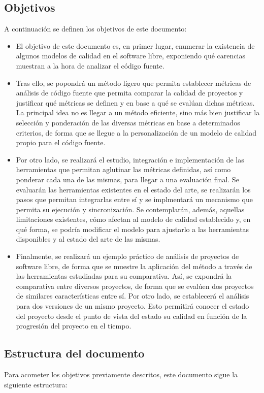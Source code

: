 \documentclass[11pt]{article}
\begin{document}
\subsection{Objetivos}
A continuación se definen los objetivos de este documento:
\begin{itemize}
\item{El objetivo de este documento es, en primer lugar, enumerar la existencia de algunos modelos de calidad en el software libre, exponiendo qué carencias muestran a la hora de analizar el código fuente.}
\item{Tras ello, se popondrá un método ligero que permita establecer métricas de análisis de código fuente que permita comparar la calidad de proyectos y justificar qué métricas se definen y en base a qué se evalúan dichas métricas. La principal idea no es llegar a un método eficiente, sino más bien justificar la selección y ponderación de las diversas métricas en base a determinados criterios, de forma que se llegue a la personalización de un modelo de calidad propio para el código fuente}.
\item{Por otro lado, se realizará el estudio, integración e implementación de las herramientas que permitan aglutinar las métricas definidas, así como ponderar cada una de las mismas, para llegar a una evaluación final. Se evaluarán las herramientas existentes en el estado del arte, se realizarán los pasos que permitan integrarlas entre sí y se implmentará un mecanismo que permita su ejecución y sincronización. Se contemplarán, además, aquellas limitaciones existentes, cómo afectan al modelo de calidad establecido y, en qué forma, se podría modificar el modelo para ajustarlo a las herramientas disponibles y al estado del arte de las mismas}.
\item{Finalmente, se realizará un ejemplo práctico de análisis de proyectos de software libre, de forma que se muestre la aplicación del método a través de las herramientas estudiadas para su comparativa. Así, se expondrá la comparativa entre diversos proyectos, de forma que se evalúen dos proyectos de similares características entre sí. Por otro lado, se establecerá el análisis para dos versiones de un mismo proyecto. Esto permitirá conocer el estado del proyecto desde el punto de vista del estado su calidad en función de la progresión del proyecto en el tiempo}.
\end{itemize}

\subsection{Estructura del documento}
Para acometer los objetivos previamente descritos, este documento sigue la siguiente estructura:
\end{document}
